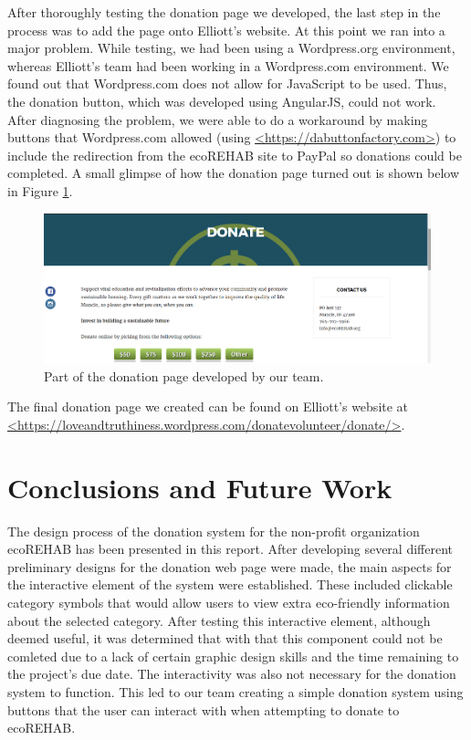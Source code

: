 \documentclass[letter]{article}
\begin{document}
After thoroughly testing the donation page we developed, the last step
in the process was to add the page onto Elliott's website. At this point
we ran into a major problem. While testing, we had been using a
Wordpress.org environment, whereas Elliott's team had been working in a
Wordpress.com environment. We found out that Wordpress.com does not
allow for JavaScript to be used. Thus, the donation button, which was
developed using AngularJS, could not work. After diagnosing the
problem, we were able to do a workaround by making buttons that
Wordpress.com allowed (using \url{<https://dabuttonfactory.com>}) to
include the redirection from the ecoREHAB site to PayPal so donations
could be completed. A small glimpse of how the donation page turned
out is shown below in Figure \ref{fig:4}.
\begin{figure}[H]
	\includegraphics[scale=0.5]{Donation}
	\captionsetup{justification=centering}
	\centering
	\caption{Part of the donation page developed by our team.}
	\label{fig:4}
\end{figure}
The final donation page we created can be found on Elliott's website at \url{<https://loveandtruthiness.wordpress.com/donatevolunteer/donate/>}.

\section*{Conclusions and Future Work}
The design process of the donation system for the non-profit
organization ecoREHAB has been presented in this report. After
developing several different preliminary designs for the donation web
page were made, the main aspects for the interactive element of the
system were established. These included clickable category symbols
that would allow users to view extra eco-friendly information about
the selected category. After testing this interactive element,
although deemed useful, it was determined that with that this
component could not be comleted due to a lack of certain graphic
design skills and the time remaining to the project's due date. The
interactivity was also not necessary for the donation system to
function. This led to our team creating a simple donation system using
buttons that the user can interact with when attempting to donate to
ecoREHAB.
\end{document}
